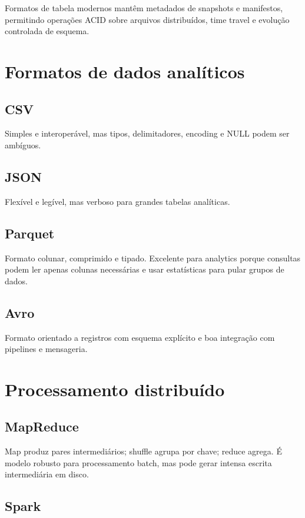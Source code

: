 Formatos de tabela modernos mantêm metadados de snapshots e manifestos, permitindo operações ACID sobre arquivos distribuídos, time travel e evolução controlada de esquema.

\section{Formatos de dados analíticos}

\subsection{CSV}

Simples e interoperável, mas tipos, delimitadores, encoding e NULL podem ser ambíguos.

\subsection{JSON}

Flexível e legível, mas verboso para grandes tabelas analíticas.

\subsection{Parquet}

Formato colunar, comprimido e tipado. Excelente para analytics porque consultas podem ler apenas colunas necessárias e usar estatísticas para pular grupos de dados.

\subsection{Avro}

Formato orientado a registros com esquema explícito e boa integração com pipelines e mensageria.

\section{Processamento distribuído}

\subsection{MapReduce}

Map produz pares intermediários; shuffle agrupa por chave; reduce agrega. É modelo robusto para processamento batch, mas pode gerar intensa escrita intermediária em disco.

\subsection{Spark}

